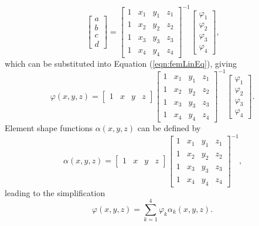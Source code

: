 \begin{equation}
    \begin{bmatrix} a \\ b \\ c \\ d \end{bmatrix} = \begin{bmatrix} 1 & x_1 & y_1 & z_1 \\ 1 & x_2 & y_2 & z_2 \\ 1 & x_3 & y_3 & z_3 \\ 1 & x_4 & y_4 & z_4 \end{bmatrix}^{-1} \begin{bmatrix} \varphi_1 \\ \varphi_2 \\ \varphi_3 \\ \varphi_4 \end{bmatrix} \text{,}
\end{equation}
which can be substituted into Equation (\ref{eqn:femLinEq}), giving
\begin{equation}
    \varphi\left(x,y,z\right) = \begin{bmatrix} 1 & x & y & z \end{bmatrix} \begin{bmatrix} 1 & x_1 & y_1 & z_1 \\ 1 & x_2 & y_2 & z_2 \\ 1 & x_3 & y_3 & z_3 \\ 1 & x_4 & y_4 & z_4 \end{bmatrix}^{-1} \begin{bmatrix} \varphi_1 \\ \varphi_2 \\ \varphi_3 \\ \varphi_4 \end{bmatrix} \text{.}
\end{equation}
Element shape functions \(\alpha\left(x,y,z\right)\) can be defined by
\begin{equation}
    \alpha\left(x,y,z\right) = \begin{bmatrix} 1 & x & y & z \end{bmatrix} \begin{bmatrix} 1 & x_1 & y_1 & z_1 \\ 1 & x_2 & y_2 & z_2 \\ 1 & x_3 & y_3 & z_3 \\ 1 & x_4 & y_4 & z_4 \end{bmatrix}^{-1} \text{,}
\end{equation}
leading to the simplification
\begin{equation}\label{eqn:femDiscretisedPhi}
    \varphi\left(x,y,z\right) = \sum_{k = 1}^4 \varphi_k \alpha_k\left(x,y,z\right) \text{.}
\end{equation}

